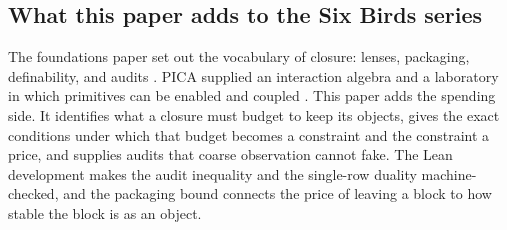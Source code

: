 \subsection{What this paper adds to the Six Birds series}

The foundations paper set out the vocabulary of closure: lenses, packaging, definability, and audits \cite{tsiokos2026sixbirds}. PICA supplied an interaction algebra and a laboratory in which primitives can be enabled and coupled \cite{tsiokos2026create}. This paper adds the spending side. It identifies what a closure must budget to keep its objects, gives the exact conditions under which that budget becomes a constraint and the constraint a price, and supplies audits that coarse observation cannot fake. The Lean development makes the audit inequality and the single-row duality machine-checked, and the packaging bound connects the price of leaving a block to how stable the block is as an object.
